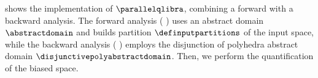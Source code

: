{ %
\newcommand\F{\textup{F}}
\newcommand\E{\textup{E}}
\newcommand\C{\textup{C}}
\renewcommand\B{\textup{B}}
\newcommand\I{\textup{I}}
\renewcommand\a{\defabstractvalue}
\newcommand\p{\defabstractactivationpattern}
\renewcommand\O{\textup{O}}
\renewcommand\o{\textup{o}}
\renewcommand\j{\textit{j}}



 shows the implementation of $\parallelqlibra$, combining a forward with a backward analysis.
The forward analysis (\cf{} ) uses an abstract domain $\abstractdomain$ and builds partition $\definputpartitions$ of the input space, while the backward analysis (\cf{} ) employs the disjunction of polyhedra abstract domain $\disjunctivepolyabstractdomain$.
Then, we perform the quantification of the biased space.



}
